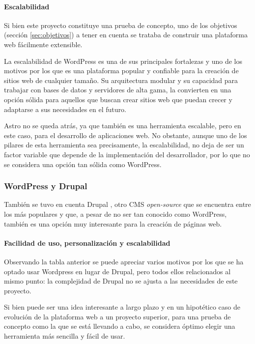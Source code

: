                 \paragraph{Escalabilidad}
                
                    Si bien este proyecto constituye una prueba de concepto, uno de los objetivos (sección \ref{sec:objetivos}) a tener en cuenta se trataba de construir una plataforma web fácilmente extensible.

                    La escalabilidad de WordPress es una de sus principales fortalezas y uno de los motivos por los que es una plataforma popular y confiable para la creación de sitios web de cualquier tamaño. Su arquitectura modular y su capacidad para trabajar con bases de datos y servidores de alta gama, la convierten en una opción sólida para aquellos que buscan crear sitios web que puedan crecer y adaptarse a sus necesidades en el futuro.

                    Astro no se queda atrás, ya que también es una herramienta escalable, pero en este caso, para el desarrollo de aplicaciones web. No obstante, aunque uno de los pilares de esta herramienta sea precisamente, la escalabilidad, no deja de ser un factor variable que depende de la implementación del desarrollador, por lo que no se considera una opción tan sólida como WordPress.

            \subsubsection{WordPress y Drupal}

                También se tuvo en cuenta Drupal \cite{drupal}, otro CMS \textit{open-source} que se encuentra entre los más populares y que, a pesar de no ser tan conocido como WordPress, también es una opción muy interesante para la creación de páginas web.

                \paragraph{Facilidad de uso, personalización y escalabilidad}
                
                    Observando la tabla anterior se puede apreciar varios motivos por los que se ha optado usar Wordpress en lugar de Drupal, pero todos ellos relacionados al mismo punto: la complejidad de Drupal no se ajusta a las necesidades de este proyecto.
    
                    Si bien puede ser una idea interesante a largo plazo y en un hipotético caso de evolución de la plataforma web a un proyecto superior, para una prueba de concepto como la que se está llevando a cabo, se considera óptimo elegir una herramienta más sencilla y fácil de usar.
    
